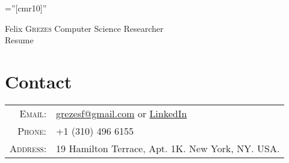 \documentclass[a4paper,10pt]{article}
\begin{document}

\pagestyle{empty} %

\font\fb=''[cmr10]'' %

\par{
    {\Huge Felix \textsc{Grezes}
    \hspace*{\fill} {\huge Computer Science Researcher}\\
    \hspace*{\fill} {\huge Resume}
    }\bigskip
    \par}

\vspace{-0.2cm}
\section{Contact}
    \begin{tabular}{rl}
        \textsc{Email:}     & \href{mailto:grezesf@gmail.com}{grezesf@gmail.com} or \href{https://www.linkedin.com/in/felix-grezes}{LinkedIn}\\
        \textsc{Phone:}     & +1 (310) 496 6155\\
        \textsc{Address:}   & 19 Hamilton Terrace, Apt. 1K. New York, NY. USA.  \\
    \end{tabular}
\bigskip

\end{document}
